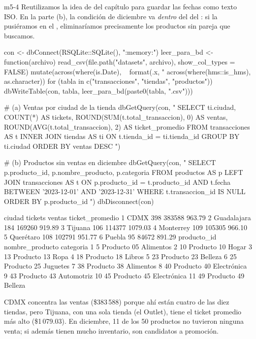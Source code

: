 \begin{solucion}{m5-4}
Reutilizamos la idea de  del capítulo para
guardar las fechas como texto ISO. En la parte (b), la condición de
diciembre va \emph{dentro} del  del : si la
pusiéramos en el , eliminaríamos precisamente los productos
sin pareja que buscamos.

\begin{rcode}
con <- dbConnect(RSQLite::SQLite(), ":memory:")
leer_para_bd <- function(archivo) {
  read_csv(file.path("datasets", archivo), show_col_types = FALSE) %
    mutate(across(where(is.Date), ~ format(.x, "%
           across(where(hms::is_hms), as.character))
}
for (tabla in c("transacciones", "tiendas", "productos")) {
  dbWriteTable(con, tabla, leer_para_bd(paste0(tabla, ".csv")))
}

# (a) Ventas por ciudad de la tienda
dbGetQuery(con, "
  SELECT ti.ciudad,
         COUNT(*)                           AS tickets,
         ROUND(SUM(t.total_transaccion), 0) AS ventas,
         ROUND(AVG(t.total_transaccion), 2) AS ticket_promedio
  FROM transacciones AS t
  INNER JOIN tiendas AS ti ON t.tienda_id = ti.tienda_id
  GROUP BY ti.ciudad
  ORDER BY ventas DESC
")

# (b) Productos sin ventas en diciembre
dbGetQuery(con, "
  SELECT p.producto_id, p.nombre_producto, p.categoria
  FROM productos AS p
  LEFT JOIN transacciones AS t
         ON p.producto_id = t.producto_id
        AND t.fecha BETWEEN '2023-12-01' AND '2023-12-31'
  WHERE t.transaccion_id IS NULL
  ORDER BY p.producto_id
")
dbDisconnect(con)
\end{rcode}

\begin{rsalida}
       ciudad tickets ventas ticket_promedio
1        CDMX     398 383588          963.79
2 Guadalajara     184 169260          919.89
3     Tijuana     106 114377         1079.03
4   Monterrey     109 105305          966.10
5   Querétaro     108 102791          951.77
6      Puebla      95  84672          891.29
   producto_id nombre_producto   categoria
1            5     Producto 05   Alimentos
2           10     Producto 10       Hogar
3           13     Producto 13        Ropa
4           18     Producto 18      Libros
5           23     Producto 23     Belleza
6           25     Producto 25    Juguetes
7           38     Producto 38   Alimentos
8           40     Producto 40 Electrónica
9           43     Producto 43  Automotriz
10          45     Producto 45 Electrónica
11          49     Producto 49     Belleza
\end{rsalida}

CDMX concentra las ventas (\$383\,588) porque ahí están cuatro de las diez
tiendas, pero Tijuana, con una sola tienda (el Outlet), tiene el ticket
promedio más alto (\$1\,079.03). En diciembre, 11 de los 50 productos no
tuvieron ninguna venta; si además tienen mucho inventario, son candidatos a
promoción.
\end{solucion}

